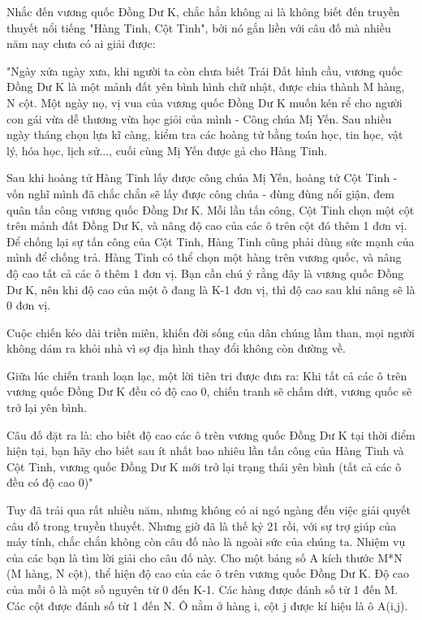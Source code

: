 Nhắc đến vương quốc Đồng Dư K, chắc hẳn không ai là không biết đến truyền thuyết nổi tiếng "Hàng Tinh, Cột Tinh", bởi nó gắn liền với câu đố mà nhiều năm nay chưa có ai giải được:

"Ngày xửa ngày xưa, khi người ta còn chưa biết Trái Đất hình cầu, vương quốc Đồng Dư K là một mảnh đất yên bình hình chữ nhật, được chia thành M hàng, N cột. Một ngày nọ, vị vua của vương quốc Đồng Dư K muốn kén rể cho người con gái vừa dễ thương vừa học giỏi của mình - Công chúa Mị Yến. Sau nhiều ngày tháng chọn lựa kĩ càng, kiểm tra các hoàng tử bằng toán học, tin học, vật lý, hóa học, lịch sử..., cuối cùng Mị Yến được gả cho Hàng Tinh.

Sau khi hoàng tử Hàng Tinh lấy được công chúa Mị Yến, hoàng tử Cột Tinh - vốn nghĩ mình đã chắc chắn sẽ lấy được công chúa - đùng đùng nổi giận, đem quân tấn công vương quốc Đồng Dư K. Mỗi lần tấn công, Cột Tinh chọn một cột trên mảnh đất Đồng Dư K, và nâng độ cao của các ô trên cột đó thêm 1 đơn vị. Để chống lại sự tấn công của Cột Tinh, Hàng Tinh cũng phải dùng sức mạnh của mình để chống trả. Hàng Tinh có thể chọn một hàng trên vương quốc, và nâng độ cao tất cả các ô thêm 1 đơn vị. Bạn cần chú ý rằng đây là vương quốc Đồng Dư K, nên khi độ cao của một ô đang là K-1 đơn vị, thì độ cao sau khi nâng sẽ là 0 đơn vị.

Cuộc chiến kéo dài triền miên, khiến đời sống của dân chúng lầm than, mọi người không dám ra khỏi nhà vì sợ địa hình thay đổi không còn đường về.

Giữa lúc chiến tranh loạn lạc, một lời tiên tri được đưa ra: Khi tất cả các ô trên vương quốc Đồng Dư K đều có độ cao 0, chiến tranh sẽ chấm dứt, vương quốc sẽ trở lại yên bình.

Câu đố đặt ra là: cho biết độ cao các ô trên vương quốc Đồng Dư K tại thời điểm hiện tại, bạn hãy cho biết sau ít nhất bao nhiêu lần tấn công của Hàng Tinh và Cột Tinh, vương quốc Đồng Dư K mới trở lại trạng thái yên bình (tất cả các ô đều có độ cao 0)"

Tuy đã trải qua rất nhiều năm, nhưng không có ai ngó ngàng đến việc giải quyết câu đố trong truyền thuyết. Nhưng giờ đã là thế kỷ 21 rồi, với sự trợ giúp của máy tính, chắc chắn không còn câu đố nào là ngoài sức của chúng ta. Nhiệm vụ của các bạn là tìm lời giải cho câu đố này.
Cho một bảng số A kích thước M*N (M hàng, N cột), thể hiện độ cao của các ô trên vương quốc Đồng Dư K. Độ cao của mỗi ô là một số nguyên từ 0 đến K-1. Các hàng được đánh số từ 1 đến M. Các cột được đánh số từ 1 đến N. Ô nằm ở hàng i, cột j được kí hiệu là ô A(i,j).

